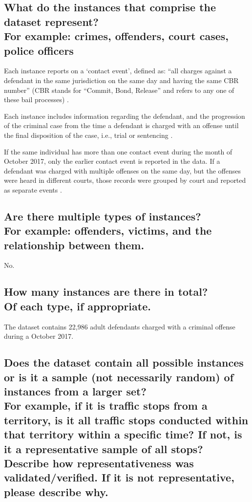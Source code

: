 \documentclass[letterpaper, 10 pt, conference]{ieeeconf}  %
\newcommand{\subtitle}[1]{{\\ \small \normalfont \color{purple} #1}}
\begin{document}
\subsection{What do the instances that comprise the dataset represent? \subtitle{For example: crimes, offenders, court cases, police officers}}

Each instance reports on a `contact event', defined as: ``all charges against a defendant in the same jurisdiction on the same day and having the same CBR number'' (CBR stands for “Commit, Bond, Release” and refers to any one of these bail processes) \cite{codebook}.

Each instance includes information regarding the defendant, and the progression of the criminal case from the time a defendant is charged with an offense until
the final disposition of the case, i.e., trial or sentencing \cite{codebook}.

If the same individual has more than one contact event during the month of October 2017, only the earlier contact event is reported in the data. If a defendant was charged with multiple offenses on the same day, but the offenses were heard in
different courts, those records were grouped by court and reported as separate events \cite{codebook}.

\subsection{Are there multiple types of instances? \subtitle{For example: offenders, victims, and the relationship between them.}}

No.

\subsection{How many instances are there in total? \subtitle{Of each type, if appropriate.}}

The dataset contains 22,986 adult defendants charged with a criminal offense during a October 2017.

\subsection{Does the dataset contain all possible instances or is it a sample (not necessarily random) of instances from a larger set? \subtitle{For example, if it is traffic stops from a territory, is it all traffic stops conducted within that territory within a specific time? If not, is it a representative sample of all stops? Describe how representativeness was validated/verified. If it is not representative, please describe why.}}
\end{document}

